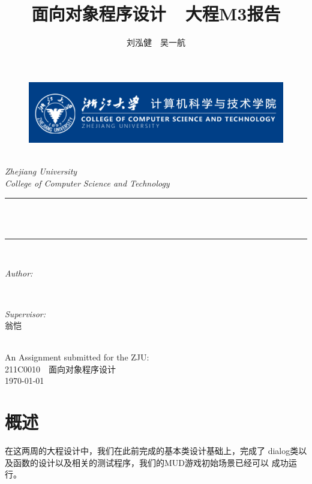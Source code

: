 \documentclass[UTF8]{ctexart}
\title{\heiti 面向对象程序设计\ \ 大程M3报告}
\author{\Large \kaishu \textup{刘泓健\ \ 吴一航}}
\begin{document}
\begin{titlepage}
	\newcommand{\HRule}{\rule{\linewidth}{0.5mm}}
	\begin{figure}
        \flushleft
        \includegraphics[scale=0.4]{0.png}
    \end{figure}
    \center 
	\quad\\[1.5cm]
	\textsl{\Large Zhejiang University }\\[0.5cm] 
	\textsl{\large College of Computer Science and Technology}\\[0.5cm] 
	\makeatletter
	\HRule \\[0.4cm]
	{ \huge \bfseries \@title}\\[0.4cm] 
	\HRule \\[1.5cm]
	\begin{minipage}{0.4\textwidth}
		\begin{flushleft} \Large
			\emph{Author:}\\
			\@author 
		\end{flushleft}
	\end{minipage}
	~
	\begin{minipage}{0.4\textwidth}
		\begin{flushright} \Large \kaishu
			\emph{Supervisor:} \\
			\textup{翁恺}
		\end{flushright}
	\end{minipage}\\[3cm]
	\makeatother
	{\large An Assignment submitted for the ZJU:}\\[0.5cm]
	{\large {211C0010\ \ 面向对象程序设计}}\\[0.5cm]
	{\large \today}\\[2cm] 
	\vfill 
\end{titlepage}
    
    \section{概述}
    在这两周的大程设计中，我们在此前完成的基本类设计基础上，完成了
    dialog类以及函数的设计以及相关的测试程序，我们的MUD游戏初始场景已经可以
    成功运行。
\end{document}

